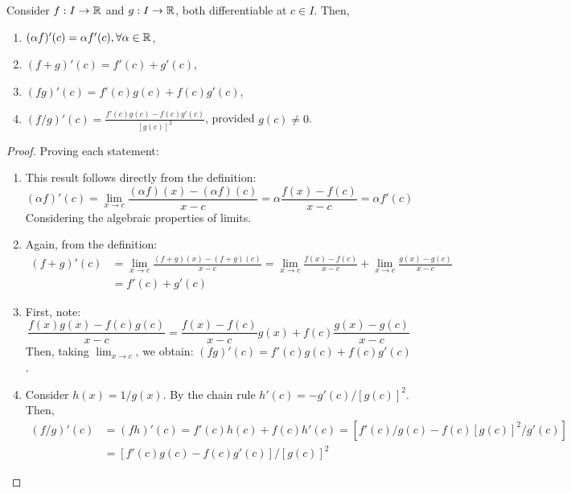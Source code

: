 \begin{theorem}
    Consider $f: I \to \mathbb{R}$ and $g: I \to \mathbb{R}$, both differentiable at $c \in I$. Then,
    \begin{enumerate}
        \item $(\alpha f)'(c) = \alpha f'(c), \forall \alpha \in \mathbb{R}$,
        \item $(f + g)'(c) = f'(c) + g'(c)$,
        \item $(fg)'(c) = f'(c)g(c) + f(c)g'(c)$,
        \item $(f/g)'(c) = \frac{f'(c)g(c) - f(c)g'(c)}{[g(c)]^2}$, provided $g(c) \neq 0$.
    \end{enumerate}
\end{theorem}

\begin{proof}
    Proving each statement:
    \begin{enumerate}
        \item This result follows directly from the definition:
            \begin{equation*}
                (\alpha f)'(c) = \lim \limits_{x \to c} \frac{(\alpha f)(x) - (\alpha f)(c)}{x - c} = \alpha \frac{f(x) - f(c)}{x-c} = \alpha f'(c)
            \end{equation*}
        Considering the algebraic properties of limits.
        \item Again, from the definition:
            \begin{align*}
                (f + g)'(c) &= \lim \limits_{x \to c}\frac{(f + g)(x) - (f + g)(c)}{x - c} = \lim \limits_{x \to c} \frac{f(x) - f(c)}{x-c} + \lim \limits_{x \to c}\frac{g(x) - g(c)}{x-c} \\
                &= f'(c)+g'(c)
            \end{align*}
        \item First, note:
            \begin{equation*}
                \frac{f(x)g(x) - f(c)g(c)}{x - c} = \frac{f(x) - f(c)}{x- c}g(x) + f(c) \frac{g(x) - g(c)}{x - c}
            \end{equation*}
            Then, taking $\lim_{x \to c}$, we obtain: $ (fg)'(c) = f'(c)g(c) + f(c)g'(c)$.
        \item Consider $h(x) = 1/g(x)$. By the chain rule $h'(c) = -g'(c)/[g(c)]^2$. Then, 
        \begin{align*}
            (f/g)'(c) &= (fh)'(c) = f'(c)h(c) + f(c)h'(c) = [f'(c)/g(c) - f(c)[g(c)]^2/g'(c)] \\
            &= [f'(c)g(c) - f(c)g'(c)]/[g(c)]^2   
        \end{align*}
        
    \end{enumerate}
\end{proof}

